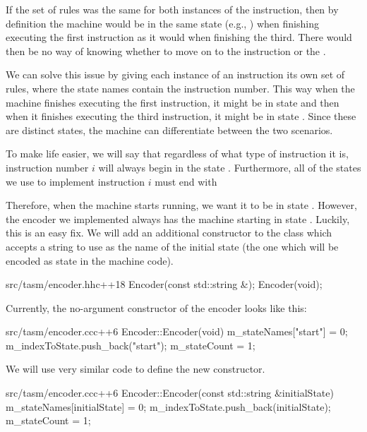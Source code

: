 If the set of rules was the same for both instances of the  instruction, then by definition the machine would be in the same state (e.g., ) when finishing executing the first instruction as it would when finishing the third. There would then be no way of knowing whether to move on to the  instruction or the .

We can solve this issue by giving each instance of an instruction its own set of rules, where the state names contain the instruction number. This way when the machine finishes executing the first instruction, it might be in state  and then when it finishes executing the third instruction, it might be in state . Since these are distinct states, the machine can differentiate between the two scenarios.

To make life easier, we will say that regardless of what type of instruction it is, instruction number $i$ will always begin in the state . Furthermore, all of the states we use to implement instruction $i$ must end with 

Therefore, when the machine starts running, we want it to be in state . However, the encoder we implemented always has the machine starting in state . Luckily, this is an easy fix. We will add an additional constructor to the  class which accepts a string to use as the name of the initial state (the one which will be encoded as state  in the machine code).

\begin{file}{src/tasm/encoder.hh}{c++}{18}
    Encoder(const std::string &);
    Encoder(void);
\end{file}

Currently, the no-argument constructor of the encoder looks like this:

\begin{file}{src/tasm/encoder.cc}{c++}{6}
Encoder::Encoder(void)
{
    m_stateNames["start"] = 0;
    m_indexToState.push_back("start");
    m_stateCount = 1;
}    
\end{file}

We will use very similar code to define the new constructor.

\begin{file}{src/tasm/encoder.cc}{c++}{6}
Encoder::Encoder(const std::string &initialState)
{
    m_stateNames[initialState] = 0;
    m_indexToState.push_back(initialState);
    m_stateCount = 1;
}    
\end{file}

